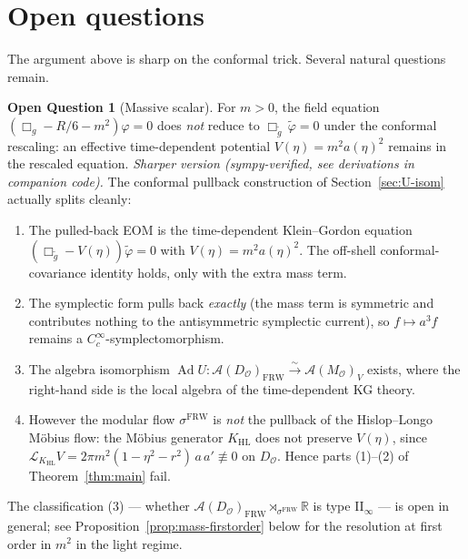 \documentclass[11pt]{article}
\theoremstyle{definition}
\newtheorem{question}[theorem]{Open Question}
\newcommand{\R}{\mathbb{R}}
\renewcommand{\AA}{\mathcal{A}}
\newcommand{\OO}{\mathcal{O}}
\newcommand{\Ad}{\operatorname{Ad}}
\newcommand{\HL}{\mathrm{HL}}
\newcommand{\FRW}{\mathrm{FRW}}
\begin{document}
\section{Open questions}\label{sec:open}

The argument above is sharp on the conformal trick. Several natural questions remain.

\begin{question}[Massive scalar]\label{q:mass}
For $m>0$, the field equation $(\Box_g - R/6 - m^2)\varphi=0$ does \emph{not} reduce to $\Box_{\tilde g}\,\tilde\varphi=0$ under the conformal rescaling: an effective time-dependent potential $V(\eta)=m^2 a(\eta)^2$ remains in the rescaled equation. \emph{Sharper version (sympy-verified, see derivations in companion code).} The conformal pullback construction of Section~\ref{sec:U-isom} actually splits cleanly:
\begin{enumerate}
\item[(a)] The pulled-back EOM is the time-dependent Klein--Gordon equation $(\Box_{\tilde g} - V(\eta))\tilde\varphi=0$ with $V(\eta)=m^2a(\eta)^2$. The off-shell conformal-covariance identity holds, only with the extra mass term.
\item[(b)] The symplectic form pulls back \emph{exactly} (the mass term is symmetric and contributes nothing to the antisymmetric symplectic current), so $f\mapsto a^3 f$ remains a $C_c^\infty$-symplectomorphism.
\item[(c)] The algebra isomorphism $\Ad U:\AA(D_\OO)_\FRW \xrightarrow{\sim} \AA(M_\OO)_V$ exists, where the right-hand side is the local algebra of the time-dependent KG theory.
\item[(d)] However the modular flow $\sigma^\FRW$ is \emph{not} the pullback of the Hislop--Longo M\"obius flow: the M\"obius generator $K_\HL$ does not preserve $V(\eta)$, since $\mathcal{L}_{K_\HL} V = 2\pi m^2(1-\eta^2-r^2)\,a\,a' \not\equiv 0$ on $D_\OO$. Hence parts (1)--(2) of Theorem~\ref{thm:main} fail.
\end{enumerate}
The classification (3) — whether $\AA(D_\OO)_\FRW \rtimes_{\sigma^\FRW}\R$ is type II$_\infty$ — is open in general; see Proposition~\ref{prop:mass-firstorder} below for the resolution at first order in $m^2$ in the light regime.
\end{question}
\end{document}

